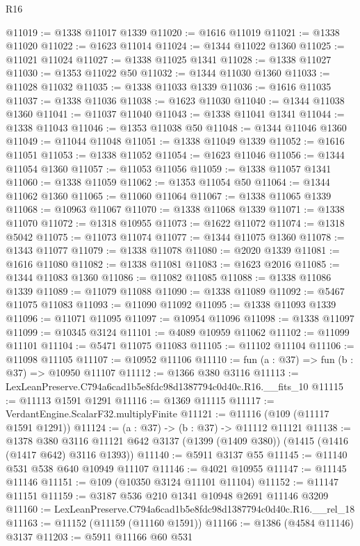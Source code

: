 \begin{lexlean}{R16}
\begin{coremodule}
@11019 := @1338 @11017 @1339
@11020 := @1616 @11019
@11021 := @1338 @11020
@11022 := @1623 @11014
@11024 := @1344 @11022 @1360
@11025 := @11021 @11024
@11027 := @1338 @11025 @1341
@11028 := @1338 @11027
@11030 := @1353 @11022 @50
@11032 := @1344 @11030 @1360
@11033 := @11028 @11032
@11035 := @1338 @11033 @1339
@11036 := @1616 @11035
@11037 := @1338 @11036
@11038 := @1623 @11030
@11040 := @1344 @11038 @1360
@11041 := @11037 @11040
@11043 := @1338 @11041 @1341
@11044 := @1338 @11043
@11046 := @1353 @11038 @50
@11048 := @1344 @11046 @1360
@11049 := @11044 @11048
@11051 := @1338 @11049 @1339
@11052 := @1616 @11051
@11053 := @1338 @11052
@11054 := @1623 @11046
@11056 := @1344 @11054 @1360
@11057 := @11053 @11056
@11059 := @1338 @11057 @1341
@11060 := @1338 @11059
@11062 := @1353 @11054 @50
@11064 := @1344 @11062 @1360
@11065 := @11060 @11064
@11067 := @1338 @11065 @1339
@11068 := @10963 @11067
@11070 := @1338 @11068 @1339
@11071 := @1338 @11070
@11072 := @1318 @10955
@11073 := @1622 @11072
@11074 := @1318 @5042
@11075 := @11073 @11074
@11077 := @1344 @11075 @1360
@11078 := @1343 @11077
@11079 := @1338 @11078
@11080 := @2020 @1339
@11081 := @1616 @11080
@11082 := @1338 @11081
@11083 := @1623 @2016
@11085 := @1344 @11083 @1360
@11086 := @11082 @11085
@11088 := @1338 @11086 @1339
@11089 := @11079 @11088
@11090 := @1338 @11089
@11092 := @5467 @11075 @11083
@11093 := @11090 @11092
@11095 := @1338 @11093 @1339
@11096 := @11071 @11095
@11097 := @10954 @11096
@11098 := @1338 @11097
@11099 := @10345 @3124
@11101 := @4089 @10959 @11062
@11102 := @11099 @11101
@11104 := @5471 @11075 @11083
@11105 := @11102 @11104
@11106 := @11098 @11105
@11107 := @10952 @11106
@11110 := fun (a : @37) => fun (b : @37) => @10950 @11107
@11112 := @1366 @380 @3116
@11113 := LexLeanPreserve.C794a6cad1b5e8fdc98d1387794c0d40c.R16.__fits_10
@11115 := @11113 @1591 @1291
@11116 := @1369 @11115
@11117 := VerdantEngine.ScalarF32.multiplyFinite
@11121 := @11116 (@109 (@11117 @1591 @1291))
@11124 := (a : @37) -> (b : @37) -> @11112 @11121
@11138 := @1378
    @380
    @3116
    @11121
    @642
    @3137
    (@1399 (@1409 @380))
    (@1415 (@1416 (@1417 @642) @3116 @1393))
@11140 := @5911 @3137 @55
@11145 := @11140 @531 @538 @640 @10949 @11107
@11146 := @4021 @10955
@11147 := @11145 @11146
@11151 := @109 (@10350 @3124 @11101 @11104)
@11152 := @11147 @11151
@11159 := @3187 @536 @210 @1341 @10948 @2691 @11146 @3209
@11160 := LexLeanPreserve.C794a6cad1b5e8fdc98d1387794c0d40c.R16.__rel_18
@11163 := @11152 (@11159 (@11160 @1591))
@11166 := @1386 (@4584 @11146) @3137
@11203 := @5911
    @11166
    @60
    @531

\end{coremodule}
\end{lexlean}
